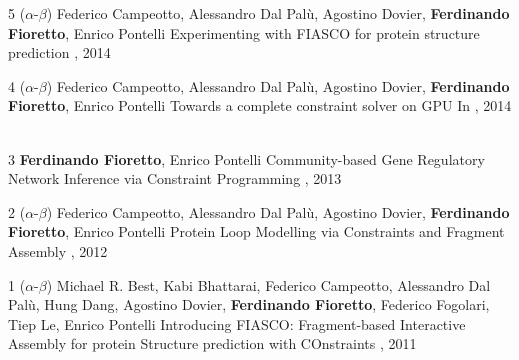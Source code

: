 \begin{pubs}
\wsentry 
	{5} %
	{($\alpha$-$\beta$) 
	Federico Campeotto, Alessandro Dal Pal\`{u}, Agostino Dovier, {\bf Ferdinando Fioretto}, Enrico Pontelli} 
  	{Experimenting with FIASCO for protein structure prediction}
	{, 2014}
	{~}

\wsentry 
	{4} %
	{($\alpha$-$\beta$) Federico Campeotto, Alessandro Dal Pal\`{u}, Agostino Dovier, {\bf Ferdinando Fioretto}, Enrico Pontelli}
	{Towards a complete constraint solver on GPU}
	{In , 2014}
	{~}

\wsentry 
	{3} %
	{{\bf Ferdinando Fioretto}, Enrico Pontelli}
	{Community-based Gene Regulatory Network Inference via Constraint Programming}
	{, 2013}
	{~} 

\wsentry
	{2} %
	{($\alpha$-$\beta$) 
	Federico Campeotto, Alessandro Dal Pal\`{u}, Agostino Dovier, {\bf Ferdinando Fioretto}, Enrico Pontelli}
	{Protein Loop Modelling via Constraints and Fragment Assembly}
	{, 2012}
	{~} 

\wsentry 
	{1} %
	{($\alpha$-$\beta$) 
	Michael R. Best, Kabi Bhattarai, Federico Campeotto, Alessandro Dal Pal\`{u}, Hung Dang, Agostino Dovier, {\bf Ferdinando Fioretto}, Federico Fogolari, Tiep Le, Enrico Pontelli}
		{Introducing FIASCO: Fragment-based Interactive Assembly for protein Structure prediction with COnstraints}
 	 {, 2011}
  	{~}
\end{pubs}

